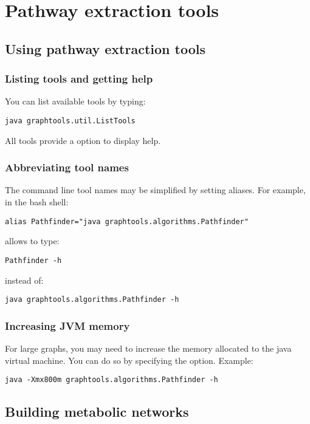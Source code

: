 \chapter{Pathway extraction tools}

\section{Using pathway extraction tools}

\subsection{Listing tools and getting help}
You can list available tools by typing:

\begin{verbatim}
java graphtools.util.ListTools
\end{verbatim}

All tools provide a  option to display help.

\subsection{Abbreviating tool names}
The command line tool names may be simplified by setting aliases.
For example, in the bash shell:
\begin{verbatim}
alias Pathfinder="java graphtools.algorithms.Pathfinder"
\end{verbatim}
allows to type:
\begin{verbatim}
Pathfinder -h
\end{verbatim}
instead of:
\begin{verbatim}
java graphtools.algorithms.Pathfinder -h
\end{verbatim}

\subsection{Increasing JVM memory}
For large graphs, you may need to increase the memory allocated to the java virtual machine.
You can do so by specifying the  option.
Example:
\begin{verbatim}
java -Xmx800m graphtools.algorithms.Pathfinder -h
\end{verbatim}

\section{Building metabolic networks}

